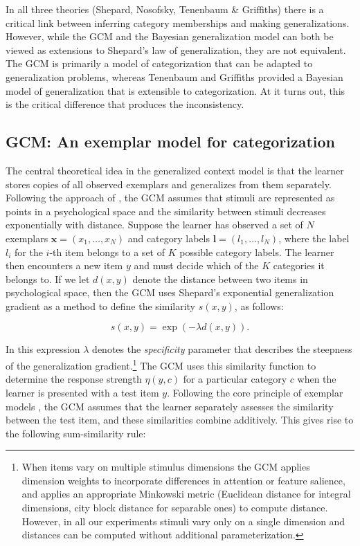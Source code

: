 \documentclass[doc,apacite]{apa6}
\begin{document}
In all three theories (Shepard, Nosofsky, Tenenbaum \& Griffiths) there is a critical link between inferring category memberships and making generalizations. However, while the GCM and the Bayesian generalization model can both be viewed as extensions to Shepard's law of generalization, they are not equivalent. The GCM is primarily a model of categorization that can be adapted to generalization problems, whereas Tenenbaum and Griffiths provided a Bayesian model of generalization that is extensible to categorization. At it turns out, this is the critical difference that produces the inconsistency.

\subsection{GCM: An exemplar model for categorization}

The central theoretical idea in the generalized context model is that the learner stores copies of all observed exemplars and generalizes from them separately. Following the approach of , the GCM assumes that stimuli are represented as points in a psychological space and the similarity between stimuli decreases exponentially with distance. Suppose the learner has observed a set of $N$ exemplars $\bm{x}=(x_1,\ldots,x_N)$ and category labels $\bm{l}=(l_1,\ldots,l_N)$, where the label $l_i$ for the $i$-th item belongs to a set of $K$ possible category labels. The learner then encounters a new item $y$ and must decide which of the $K$ categories it belongs to. If we let $d(x,y)$ denote the distance between two items in psychological space, then the GCM uses Shepard's exponential generalization gradient as a method to define the similarity $s(x,y)$, as follows:

\begin{equation}
\label{gcm1}
s(x,y) = \exp( -\lambda d(x,y) ).
\end{equation}

In this expression $\lambda$ denotes the {\it specificity} parameter that describes the steepness of the generalization gradient.\footnote{When items vary on multiple stimulus dimensions the GCM applies dimension weights to incorporate differences in attention or feature salience, and applies an appropriate Minkowski metric 
(Euclidean distance for integral dimensions, city block distance for separable ones) 
to compute distance. However, in all our experiments stimuli vary only on a single dimension and distances can be computed without additional parameterization.} 
The GCM uses this similarity function to determine the response strength $\eta(y,c)$ for a particular category $c$ when the learner is presented with a test item $y$. Following the core principle of exemplar models \cite{medin1978context}, the GCM assumes that the learner separately assesses the similarity between the test item, and these similarities combine additively. This gives rise to the following sum-similarity rule:
\end{document}
